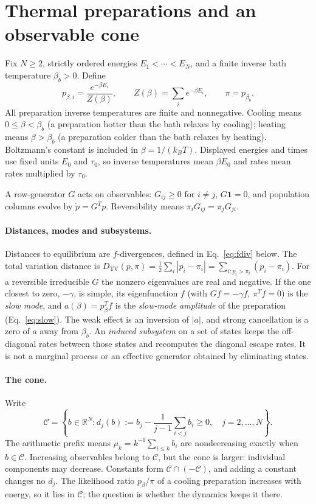 \documentclass[11pt,a4paper]{article}
\theoremstyle{remark}\newtheorem{remark}[theorem]{Remark}
\newcommand{\C}{\mathcal C}
\newcommand{\one}{\mathbf 1}
\newcommand{\TV}{D_{\mathrm{TV}}}
\newcommand{\R}{\mathbb R}
\begin{document}
\section{Thermal preparations and an observable cone}\label{sec:cone}
Fix $N\ge2$, strictly ordered energies $E_1<\cdots<E_N$, and a finite inverse bath temperature $\beta_b>0$. Define
\begin{equation}
 p_{\beta,i}=\frac{e^{-\beta E_i}}{Z(\beta)},\qquad
 Z(\beta)=\sum_i e^{-\beta E_i},\qquad \pi=p_{\beta_b}.
 \label{eq:gibbs}
\end{equation}
All preparation inverse temperatures are finite and nonnegative. Cooling means $0\le\beta<\beta_b$ (a preparation hotter than the bath relaxes by cooling); heating means $\beta>\beta_b$ (a preparation colder than the bath relaxes by heating). Boltzmann's constant is included in $\beta=1/(k_BT)$. Displayed energies and times use fixed units $E_0$ and $\tau_0$, so inverse temperatures mean $\beta E_0$ and rates mean rates multiplied by $\tau_0$.

A row-generator $G$ acts on observables: $G_{ij}\ge0$ for $i\ne j$, $G\one=0$, and population columns evolve by $\dot p=G^Tp$. Reversibility means $\pi_iG_{ij}=\pi_jG_{ji}$.

\paragraph{Distances, modes and subsystems.} Distances to equilibrium are $f$-divergences, defined in Eq.~\eqref{eq:fdiv} below. The total variation distance is $\TV(p,\pi)=\frac12\sum_i|p_i-\pi_i|=\sum_{i:p_i>\pi_i}(p_i-\pi_i)$. For a reversible irreducible $G$ the nonzero eigenvalues are real and negative. If the one closest to zero, $-\gamma$, is simple, its eigenfunction $f$ (with $Gf=-\gamma f$, $\pi^Tf=0$) is the \emph{slow mode}, and $a(\beta)=p_\beta^Tf$ is the \emph{slow-mode amplitude} of the preparation (Eq.~\eqref{eq:slow}). The weak effect is an inversion of $|a|$, and strong cancellation is a zero of $a$ away from $\beta_b$. An \emph{induced subsystem} on a set of states keeps the off-diagonal rates between those states and recomputes the diagonal escape rates. It is not a marginal process or an effective generator obtained by eliminating states.

\paragraph{The cone.} Write
\begin{equation}
 \C=\left\{b\in\R^N:
 d_j(b):=b_j-\frac1{j-1}\sum_{i<j}b_i\ge0,
 \quad j=2,\ldots,N\right\}.
 \label{eq:cone}
\end{equation}
The arithmetic prefix means $\mu_k=k^{-1}\sum_{i\le k}b_i$ are nondecreasing exactly when $b\in\C$. Increasing observables belong to $\C$, but the cone is larger: individual components may decrease. Constants form $\C\cap(-\C)$, and adding a constant changes no $d_j$. The likelihood ratio $p_\beta/\pi$ of a cooling preparation increases with energy, so it lies in $\C$; the question is whether the dynamics keeps it there.
\end{document}
